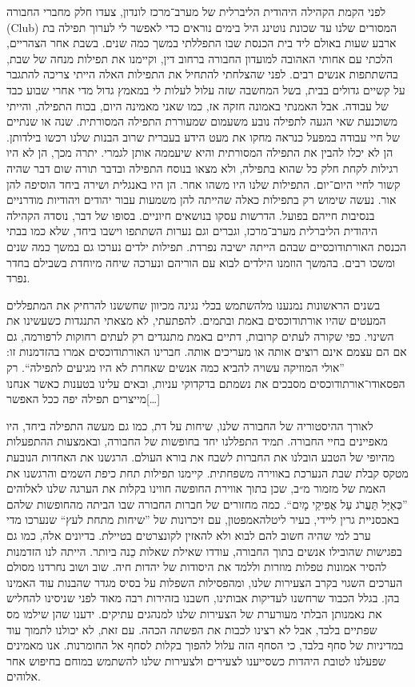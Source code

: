 \documentclass[14pt, article, extrafontsizes, twopage, a4paper]{memoir}
\begin{document}
לפני הקמת הקהילה היהודית הליברלית של מערב־מרכז לונדון, צעדו חלק מחברי החבורה (\textenglish{Club}) המסורים שלנו עד שכונת נוטינג היל בימים נוראים כדי לאפשר לי לערוך תפילה בת ארבע שעות באולם ליד בית הכנסת שבו התפללתי במשך כמה שנים. בשבת אחר הצהריים, הלכתי עם אחותי האהובה למועדון החבורה ברחוב דין, וקיימנו את תפילות מנחה של שבת, בהשתתפות אנשים רבים. לפני שהצלחתי להתחיל את התפילות האלה הייתי צריכה להתגבר על קשיים גדולים בבית, בשל המחשבה שזה עלול לעלות לי במאמץ גדול מדי אחרי שבוע כבד של עבודה. אבל האמנתי באמונה חזקה אז, כמו שאני מאמינה היום, בכוח התפילה, והייתי משוכנעת שאי הגעה לתפילה נובע משעמום שמעוררת התפילה המסורתית. שנה או שנתיים של חיי עבודה במפעל כנראה מחקו את מעט הידע בעברית שרוב הבנות שלנו רכשו בילדותן. הן לא יכלו להבין את התפילה המסורתית והיא שיעממה אותן לגמרי. יתרה מכך, הן לא היו רגילות לקחת חלק כל שהוא בתפילה, ולא מצאו בנוסח התפילה ובדבר תורה שום דבר שהיה קשור לחיי היום־יום. התפילות שלנו היו משהו אחר. הן היו באנגלית ושירה ביחד הוסיפה להן אור. נעשה שימוש רק בתפילות כאלה שהייתה להן משמעות עבור יהודים ויהודיות מודרניים בנסיבות חייהם בפועל. הדרשות עסקו בנושאים חיוניים. בסופו של דבר, נוסדה הקהילה היהודית הליברלית מערב־מרכז, וגברים וגם נערות השתתפו וישבו ביחד, שלא כמו בבתי הכנסת האורתודוכסיים שבהם הייתה ישיבה נפרדת. תפילות ילדים נערכו גם במשך כמה שנים ומשכו רבים. בהמשך הוזמנו הילדים לבוא עם הוריהם ונערכה שיחה מיוחדת בשבילם בחדר נפרד.

בשנים הראשונות נמנענו מלהשתמש בכלי נגינה מכיוון שחששנו להרחיק את המתפללים המעטים שהיו אורתודוכסים באמת ובתמים. להפתעתי, לא מצאתי התנגדות כשעשינו את השינוי. כפי שקורה לעתים קרובות, דתיים באמת מתנגדים רק לעתים רחוקות לרפורמה, גם אם הם עצמם אינם רוצים אותה או מעריכים אותה. חברינו האורתודוכסים אמרו בהזדמנות זו: ”אולי המוזיקה עשויה להביא כמה אנשים שאחרת לא היו מגיעים לתפילה“. רק הפסאודו־אורתודוכסים מסבכים את נשמתם בדקדוקי עניות, ובאים עלינו בטענות כאשר אנחנו מייצרים תפילה יפה ככל האפשר[…]

לאורך ההיסטוריה של החבורה שלנו, שיחות על דת, כמו גם מעשה התפילה ביחד, היו מאפיינים בחיי החבורה. תמיד התפללנו יחד בחופשות של החבורה, ובאמצעות ההתפעלות מהיופי של הטבע הובלנו את החברות לשבח את בורא העולם. הרגשנו את האחדות הנובעת מטקס קבלת שבת הנערכת באווירה משפחתית. קיימנו תפילות תחת כיפת השמים והרגשנו את האמת של מזמור מ״ב, שכן בתוך אווירת החופשה חווינו בקלות את הערגה שלנו לאלוהים ”כְּאַיָּל תַּעֲרֹג עַל אֲפִיקֵי מָיִם“. כמה מחזורים של חברות החבורה שבו הביתה מהחופשות שלהם באכסניית גרין ליידי, בעיר ליטלהאמפטון, עם זיכרונות של ”שיחות מתחת לעץ“ שנערכו מדי ערב למי שהיה חשוב להם לבוא ולא להאזין לקונצרטים בטיילת. בדיונים אלה, כמו גם בפגישות שהובילו אנשים בתוך החבורה, עודדו שאילת שאלות כֵנה ביותר. הייתה לנו הזדמנות להסיר אמונות טפלות מוזרות וללמד את היסודות של יהדות חיה. שוב ושוב נחרדנו מסולם הערכים השגוי בקרב הצעירות שלנו, ומהפסילות השפלות על בסיס מגדר שהבנות עוד האמינו בהן. בגלל הכבוד שרחשנו לעדיקות אבותינו, חשבנו בזהירות רבה מאוד לפני שניסינו להחליש את נאמנותן הבלתי מעורערת של הצעירות שלנו למנהגים עתיקים. ידענו שהן שילמו מס שפתיים בלבד, אבל לא רצינו לכבות את הפשתה הכהה. עם זאת, לא יכולנו לתמוך עוד במדיניות של סחף בלבד, כי הסחף הזה עלול להפוך בקלות לסחף אל החומרנות. אנו מאמינים שפעלנו לטובת היהדות כשסייענו לצעירים ולצעירות שלנו להשתמש במוחם בחיפוש אחר אלוהים.
\end{document}
